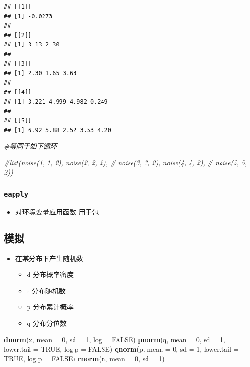 \documentclass[]{book}
\newenvironment{Shaded}{\begin{snugshade}}{\end{snugshade}}
\newcommand{\CommentTok}[1]{\textcolor[rgb]{0.56,0.35,0.01}{\textit{#1}}}
\newcommand{\DataTypeTok}[1]{\textcolor[rgb]{0.13,0.29,0.53}{#1}}
\newcommand{\DecValTok}[1]{\textcolor[rgb]{0.00,0.00,0.81}{#1}}
\newcommand{\KeywordTok}[1]{\textcolor[rgb]{0.13,0.29,0.53}{\textbf{#1}}}
\newcommand{\NormalTok}[1]{#1}
\newcommand{\OtherTok}[1]{\textcolor[rgb]{0.56,0.35,0.01}{#1}}
\providecommand{\tightlist}{%
  \setlength{\itemsep}{0pt}\setlength{\parskip}{0pt}}
\begin{document}
\begin{verbatim}
## [[1]]
## [1] -0.0273
## 
## [[2]]
## [1] 3.13 2.30
## 
## [[3]]
## [1] 2.30 1.65 3.63
## 
## [[4]]
## [1] 3.221 4.999 4.982 0.249
## 
## [[5]]
## [1] 6.92 5.88 2.52 3.53 4.20
\end{verbatim}

\begin{Shaded}
\begin{Highlighting}[]
\CommentTok{#等同于如下循环}

\CommentTok{#list(noise(1, 1, 2), noise(2, 2, 2),}
\CommentTok{#    noise(3, 3, 2), noise(4, 4, 2),}
\CommentTok{#    noise(5, 5, 2))}
\end{Highlighting}
\end{Shaded}

\hypertarget{eapply}{%
\subsubsection{\texorpdfstring{\texttt{eapply}}{eapply}}\label{eapply}}

\begin{itemize}
\tightlist
\item
  对环境变量应用函数 用于包
\end{itemize}

\hypertarget{ux6a21ux62df}{%
\subsection{模拟}\label{ux6a21ux62df}}

\begin{itemize}
\tightlist
\item
  在某分布下产生随机数

  \begin{itemize}
  \tightlist
  \item
    d 分布概率密度
  \item
    r 分布随机数
  \item
    p 分布累计概率
  \item
    q 分布分位数
  \end{itemize}
\end{itemize}

\begin{Shaded}
\begin{Highlighting}[]
\KeywordTok{dnorm}\NormalTok{(x, }\DataTypeTok{mean =} \DecValTok{0}\NormalTok{, }\DataTypeTok{sd =} \DecValTok{1}\NormalTok{, }\DataTypeTok{log =} \OtherTok{FALSE}\NormalTok{)}
\KeywordTok{pnorm}\NormalTok{(q, }\DataTypeTok{mean =} \DecValTok{0}\NormalTok{, }\DataTypeTok{sd =} \DecValTok{1}\NormalTok{, }\DataTypeTok{lower.tail =} \OtherTok{TRUE}\NormalTok{, }\DataTypeTok{log.p =} \OtherTok{FALSE}\NormalTok{)}
\KeywordTok{qnorm}\NormalTok{(p, }\DataTypeTok{mean =} \DecValTok{0}\NormalTok{, }\DataTypeTok{sd =} \DecValTok{1}\NormalTok{, }\DataTypeTok{lower.tail =} \OtherTok{TRUE}\NormalTok{, }\DataTypeTok{log.p =} \OtherTok{FALSE}\NormalTok{)}
\KeywordTok{rnorm}\NormalTok{(n, }\DataTypeTok{mean =} \DecValTok{0}\NormalTok{, }\DataTypeTok{sd =} \DecValTok{1}\NormalTok{)}
\end{Highlighting}
\end{Shaded}
\end{document}
